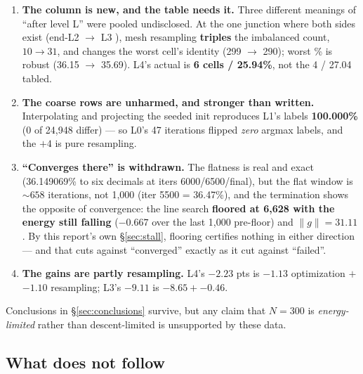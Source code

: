 \documentclass[11pt,a4paper]{article}
\begin{document}
\begin{tcolorbox}[colback=red!4!white,colframe=red!55!black,
  title={Correction (2026-08-15, adversarial review): mixed estimators, and
  level~2 did not demonstrably converge}]
\begin{enumerate}[leftmargin=*,itemsep=3pt]
  \item \textbf{The  column is new, and the table needs it.} Three
    different meanings of ``after level L'' were pooled undisclosed. At the one
    junction where both sides exist (end-L2 \(\to\) L3 ), mesh
    resampling \textbf{triples} the imbalanced count, \(10 \to 31\), and changes
    the worst cell's identity (299 \(\to\) 290); worst \% is robust
    (36.15 \(\to\) 35.69). L4's actual  is \textbf{6 cells /
    25.94\%}, not the 4 / 27.04 tabled.
  \item \textbf{The coarse rows are unharmed, and stronger than written.}
    Interpolating and projecting the seeded init reproduces L1's 
    labels \textbf{100.000\%} (0 of 24{,}948 differ) --- so L0's 47 iterations
    flipped \emph{zero} argmax labels, and the \(+4\) is pure resampling.
  \item \textbf{``Converges there'' is withdrawn.} The flatness is real and exact
    (36.149069\% to six decimals at iters 6000/6500/final), but the flat window is
    \(\sim\!658\) iterations, not 1{,}000 (iter 5500 = 36.47\%), and the
    termination shows the opposite of convergence: the line search
    \textbf{floored at 6{,}628 with the energy still falling} (\(-0.667\) over the
    last 1{,}000 pre-floor) and \(\|g\| = 31.11\). By this report's own
    \S\ref{sec:stall}, flooring certifies nothing in either direction --- and that
    cuts against ``converged'' exactly as it cut against ``failed''.
  \item \textbf{The gains are partly resampling.} L4's \(-2.23\) pts is
    \(-1.13\) optimization \(+\) \(-1.10\) resampling; L3's \(-9.11\) is
    \(-8.65 + -0.46\).
\end{enumerate}
Conclusions in \S\ref{sec:conclusions} survive, but any claim that \(N{=}300\) is
\emph{energy-limited} rather than descent-limited is unsupported by these data.
\end{tcolorbox}

\subsection{What does not follow}
\end{document}

